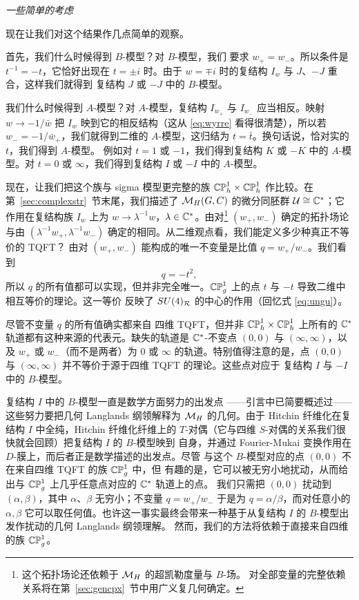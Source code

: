 \par\medskip\emph{一些简单的考虑}

现在让我们对这个结果作几点简单的观察。

首先，我们什么时候得到 $B$-模型？对 $B$-模型，我们
要求 $w_+=w_-$。所以条件是 $t^{-1}=-t$，它恰好出现在
$t=\pm i$ 时。由于 $w=\mp i$ 时的复结构 $I_w$ 与 $J$、$-J$ 重合，这样我们就得到
复结构 $J$ 或 $-J$ 中的 $B$-模型。

我们什么时候得到 $A$-模型？对 $A$-模型，复结构
$I_{w_+}$ 与 $I_{w_-}$ 应当相反。映射
$w\to -1/\bar w$ 把 $I_w$ 映到它的相反结构（这从
\eqref{eq:wyrre} 看得很清楚），所以若 $w_-=-1/\bar
w_+$，我们就得到二维的 $A$-模型，这归结为 $t=\bar t$。换句话说，恰对实的 $t$，我们得到 $A$-模型。
例如对 $t=1$ 或
$-1$，我们得到复结构 $K$ 或 $-K$ 中的 $A$-模型。对
$t=0$ 或 $\infty$，我们得到复结构 $I$
或 $-I$ 中的 $ A$-模型。

现在，让我们把这个族与 sigma 模型更完整的族
$\Bbb{CP}_h^1\times \Bbb{CP}_h^1$ 作比较。在第~\ref{sec:complexstr}~节末尾，我们描述了 $\MH(G,C)$ 的微分同胚群 ${\cal U}\cong
\Bbb{C}^*$；它作用在复结构族 $I_w$ 上为 $w\to \lambda^{-1} w$，$\lambda\in
\Bbb{C}^*$。由对\footnote{这个拓扑场论还依赖于 $\MH$ 的超凯勒度量与 $B$-场。
对全部变量的完整依赖关系将在第~\ref{sec:gencpx}~节中用广义复几何确定。}
$(w_+,w_-)$ 确定的拓扑场论与由 $(\lambda^{-1} w_+,\lambda^{-1} w_-)$ 确定的相同。从二维观点看，我们能定义多少种真正不等价的 TQFT？
由对 $(w_+,w_-)$ 能构成的唯一不变量是比值 $q=w_+/w_-$。我们看到
\begin{equation*}
\tag*{(5.12)}
q=-t^2,
\end{equation*}
 所以 $q$ 的所有值都可以实现，但并非完全唯一。$\Bbb{CP}^1_g$ 上的点 $t$ 与 $-t $ 导致二维中相互等价的理论。这一等价
反映了 $SU(4)_{\cal R}$ 的中心的作用（回忆式
\eqref{eq:ungu}）。

尽管不变量 $q$ 的所有值确实都来自
四维 TQFT，但并非 $\Bbb{CP}_h^1\times \Bbb{CP}_h^1$ 上所有的 $\Bbb{C}^*$
轨道都有这种来源的代表元。缺失的轨道是
$\Bbb{C}^*$-不变点 $(0,0)$ 与 $(\infty,\infty)$，以及
$w_+$ 或 $w_-$（而不是两者）为 0 或
$\infty$ 的轨道。特别值得注意的是，点 $(0,0)$
与 $(\infty,\infty)$ 并不等价于源于四维 TQFT 的理论。这些点对应于
复结构 $I$ 与 $-I$ 中的 $B$-模型。

复结构 $I$ 中的 $B$-模型一直是数学方面努力的出发点
——引言中已简要概述过——这些努力要把几何 Langlands 纲领解释为
$\MH$ 的几何。由于 Hitchin 纤维化在复结构 $I$ 中全纯，Hitchin 纤维化纤维上的
$T$-对偶（它与四维 $S$-对偶的关系我们很快就会回顾）把复结构 $I$ 的 $B$-模型映到
自身，并通过 Fourier-Mukai 变换作用在 $D$-膜上，而后者正是数学描述的出发点。尽管
与这个 $B$-模型对应的点 $(0,0)$ 不在来自四维 TQFT 的族 $\Bbb{CP}_g^1$ 中，但
有趣的是，它可以被无穷小地扰动，从而给出与 $\Bbb{CP}^1_g$ 上几乎任意点对应的 $\Bbb{C}^*$ 轨道上的点。
我们只需把 $(0,0)$ 扰动到 $(\alpha,\beta)$，其中 $\alpha$、$\beta$ 无穷小；不变量 $q=w_+/w_-$ 于是为 $q=\alpha/\beta$，而对任意小的
$\alpha,\beta$ 它可以取任何值。也许这一事实最终会带来一种基于从复结构 $I$ 的 $B$-模型出发作扰动的几何 Langlands 纲领理解。
然而，我们的方法将依赖于直接来自四维的族 $\Bbb{CP}^1_g$。

